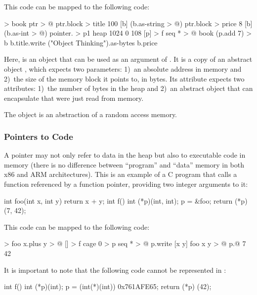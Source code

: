 \documentclass[sigplan,nonacm]{acmart}
\begin{document}
This code can be mapped to the following \eolang{} code:

\begin{ffcode}
[ptr] > book
  ptr > @
  ptr.block > title
    100
    [b] (b.as-string > @)
  ptr.block > price
    8
    [b] (b.as-int > @)
pointer. > p1
  heap 1024
  0
  108
[p] > f
  seq * > @
    book (p.add 7) > b
    b.title.write
      ("Object Thinking").as-bytes
    b.price
\end{ffcode}

Here,  is an object that can be used as an argument of . It is a copy of an abstract object , which expects two parameters: 1)~an absolute address in memory and 2)~the size of the memory block it points to, in bytes. Its attribute  expects two attributes: 1)~the number of bytes in the heap and 2)~an abstract object that can encapsulate  that were just read from memory.

The object  is an abstraction of a random access memory.

\subsubsection{Pointers to Code}

A pointer may not only refer to data in the heap but also to executable code in memory (there is no difference between ``program'' and ``data'' memory in both x86 and ARM architectures). This is an example of a C program that calls a function referenced by a function pointer, providing two integer arguments to it:

\begin{ffcode}
int foo(int x, int y) {
  return x + y;
}
int f() {
  int (*p)(int, int);
  p = &foo;
  return (*p) (7, 42);
}
\end{ffcode}

This code can be mapped to the following \eolang{} code:

\begin{ffcode}
[x y] > foo
  x.plus y > @
[] > f
  cage 0 > p
  seq * > @
    p.write
      [x y]
        foo x y > @
    p.@ 7 42
\end{ffcode}

It is important to note that the following code cannot be represented in \eolang{}:

\begin{ffcode}
int f() {
  int (*p)(int);
  p = (int(*)(int)) 0x761AFE65;
  return (*p) (42);
}
\end{ffcode}
\end{document}
